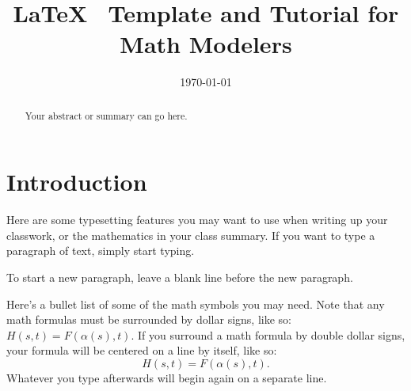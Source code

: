\documentclass[12pt]{article}   %
\begin{document}


\title{LaTeX \, Template and Tutorial for Math Modelers}
\date{\today}

\maketitle

\begin{abstract}
Your abstract or summary can go here.
\end{abstract}

\newpage

\tableofcontents

\newpage

\section{Introduction}

\vspace{1cm}

Here are some typesetting features you may want to use when writing up your classwork, or
the mathematics in your class summary. If you want to type a paragraph of text, simply
start typing.

To start a new paragraph, leave a blank line before the new paragraph.

\bigskip

Here's a bullet list of some of the math symbols you may need.  Note that any math
formulas must be surrounded by dollar signs, like so:  $H(s,t) = F(\alpha(s),t)$.  If you
surround a math formula by double dollar signs, your formula will be centered on a line by
itself, like so:
$$H(s,t) = F(\alpha(s),t).$$  Whatever you type afterwards will begin again on a separate line.
\end{document}
